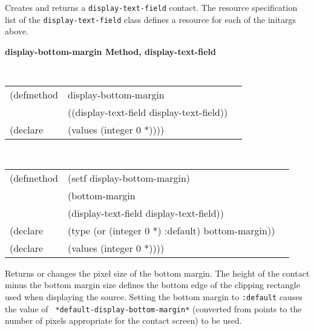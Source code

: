 \begin{flushright} \parbox[t]{6.125in}{
Creates and returns a {\tt display-text-field} contact.
The resource specification list of the {\tt display-text-field} class defines
a resource for each of the initargs above.
}\end{flushright}




{\samepage
{\large {\bf display-bottom-margin \hfill Method, display-text-field}}
\begin{flushright} \parbox[t]{6.125in}{
\tt
\begin{tabular}{lll}
\raggedright
(defmethod & display-bottom-margin & \\
& ((display-text-field  display-text-field)) \\
(declare & (values (integer 0 *))))
\end{tabular}
\rm}\end{flushright}}

\begin{flushright} \parbox[t]{6.125in}{
\tt
\begin{tabular}{lll}
\raggedright
(defmethod & (setf display-bottom-margin) & \\
& (bottom-margin \\
& (display-text-field  display-text-field)) \\
(declare &(type (or (integer 0 *) :default)  bottom-margin))\\
(declare & (values (integer 0 *))))
\end{tabular}
\rm}\end{flushright}

\begin{flushright} \parbox[t]{6.125in}{ 
Returns or changes the pixel size of the
bottom margin.  The height of the contact minus the bottom margin size defines
the bottom edge of the clipping rectangle used when displaying the source.
Setting the bottom margin to {\tt :default} causes the value of {\tt
*default-display-bottom-margin*} (converted from points to the number of pixels
appropriate for the contact screen) to be used.
  
}\end{flushright}






